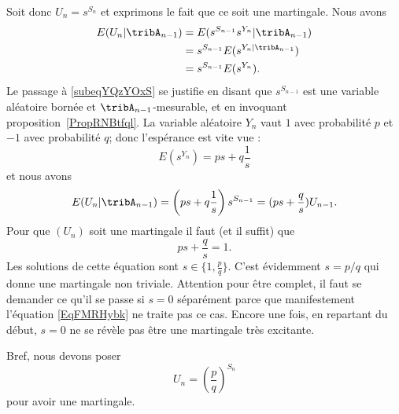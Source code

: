 Soit donc \( U_n=s^{S_n}\) et exprimons le fait que ce soit une martingale. Nous avons
\begin{subequations}
	\begin{align}
		E(U_n|\tribA_{n-1}) & =E(s^{S_{n-1}}s^{Y_n}|\tribA_{n-1})                         \\
		                    & =s^{S_{n-1}}E(s^{Y_n|\tribA_{n-1}})    \label{subeqYQzYOxS} \\
		                    & =s^{S_{n-1}}E(s^{Y_n}).
	\end{align}
\end{subequations}
Le passage à \eqref{subeqYQzYOxS} se justifie en disant que \( s^{S_{n-1}}\) est une variable aléatoire bornée et \( \tribA_{n-1}\)-mesurable, et en invoquant proposition~\ref{PropRNBtfql}. La variable aléatoire \( Y_n\) vaut \( 1\) avec probabilité \( p\) et \( -1\) avec probabilité \( q\); donc l'espérance est vite vue :
\begin{equation}
	E(s^{Y_n})=ps+q\frac{1}{ s }
\end{equation}
et nous avons
\begin{equation}
	E(U_n|\tribA_{n-1})=\left( ps+q\frac{1}{ s } \right)s^{S_{n-1}}=(ps+\frac{ q }{ s })U_{n-1}.
\end{equation}
Pour que \( (U_n)\) soit une martingale il faut (et il suffit) que
\begin{equation}    \label{EqFMRHybk}
	ps+\frac{ q }{ s }=1.
\end{equation}
Les solutions de cette équation sont \( s\in\{ 1,\frac{ p }{ q } \}\). C'est évidemment \( s=p/q\) qui donne une martingale non triviale. Attention pour être complet, il faut se demander ce qu'il se passe si \( s=0\) séparément parce que manifestement l'équation \eqref{EqFMRHybk} ne traite pas ce cas. Encore une fois, en repartant du début, \( s=0\) ne se révèle pas être une martingale très excitante.

Bref, nous devons poser
\begin{equation}
	U_n=\left( \frac{ p }{ q } \right)^{S_n}
\end{equation}
pour avoir une martingale.
